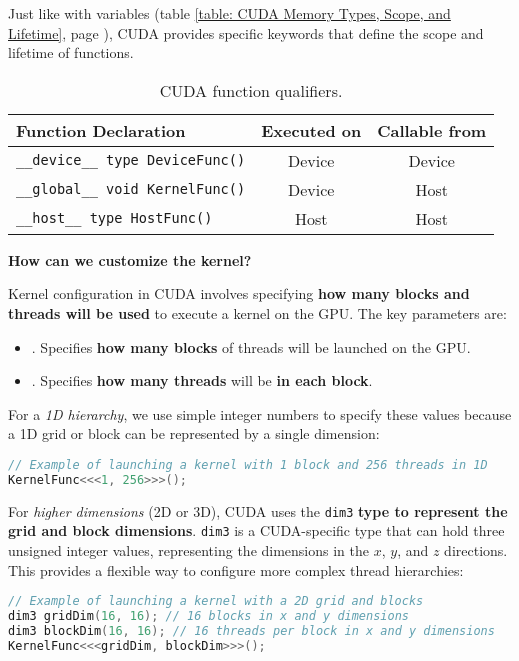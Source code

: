 Just like with variables (table \ref{table: CUDA Memory Types, Scope, and Lifetime}, page \pageref{table: CUDA Memory Types, Scope, and Lifetime}), CUDA provides specific keywords that define the scope and lifetime of functions.
\begin{table}[!htp]
    \centering
    \begin{tabular}{@{} l c c @{}}
        \toprule
        \textbf{Function Declaration} & \textbf{Executed on} & \textbf{Callable from} \\
        \midrule
        \texttt{\_\_device\_\_ type DeviceFunc()} & Device & Device \\
        \texttt{\_\_global\_\_ void KernelFunc()} & Device & Host \\
        \texttt{\_\_host\_\_ type HostFunc()} & Host & Host \\
        \bottomrule
    \end{tabular}
    \caption{CUDA function qualifiers.}
\end{table}

\highspace
\begin{flushleft}
    \textcolor{Green3}{ \textbf{How can we customize the kernel?}}
\end{flushleft}
Kernel configuration in CUDA involves specifying \textbf{how many blocks and threads will be used} to execute a kernel on the GPU. The key parameters are:
\begin{itemize}
    \item {}. Specifies \textbf{how many blocks} of threads will be launched on the GPU.
    \item {}. Specifies \textbf{how many threads} will be \textbf{in each block}.
\end{itemize}
For a \emph{1D hierarchy}, we use simple integer numbers to specify these values because a 1D grid or block can be represented by a single dimension:
\begin{lstlisting}[language=C++]
// Example of launching a kernel with 1 block and 256 threads in 1D
KernelFunc<<<1, 256>>>();    
\end{lstlisting}
For \emph{higher dimensions} (2D or 3D), CUDA uses the \texttt{dim3} \textbf{type to represent the grid and block dimensions}. \texttt{dim3} is a CUDA-specific type that can hold three unsigned integer values, representing the dimensions in the $x$, $y$, and $z$ directions. This provides a flexible way to configure more complex thread hierarchies:
\begin{lstlisting}[language=C++]
// Example of launching a kernel with a 2D grid and blocks
dim3 gridDim(16, 16); // 16 blocks in x and y dimensions
dim3 blockDim(16, 16); // 16 threads per block in x and y dimensions
KernelFunc<<<gridDim, blockDim>>>();
\end{lstlisting}

